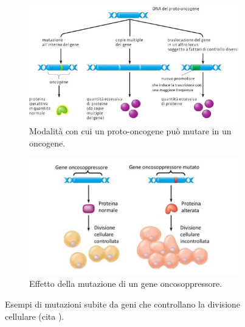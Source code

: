 \documentclass[12pt,a4paper,twoside]{report}
\begin{document}
	\begin{figure}[H]
		\centering
		\begin{subfigure}[b]{0.9\textwidth}
			\centering
			\includegraphics[width=\textwidth, scale=0.5]{oncogene.png}
			\caption{Modalità con cui un proto-oncogene può mutare in un oncogene.}
			\label{fig:oncogene}
		\end{subfigure}
		\par
		\begin{subfigure}[b]{0.9\textwidth}
			\centering
			\includegraphics[width=\textwidth, scale=0.5]{oncosoppressore.jpg}
			\caption{Effetto della mutazione di un gene oncosoppressore.}
			\label{fig:oncosoppressore}
		\end{subfigure}
		\caption{Esempi di mutazioni subite da geni che controllano la divisione cellulare (cita
			).}
		\label{fig:mutazioni_genetiche}
	\end{figure}
	
\end{document}
